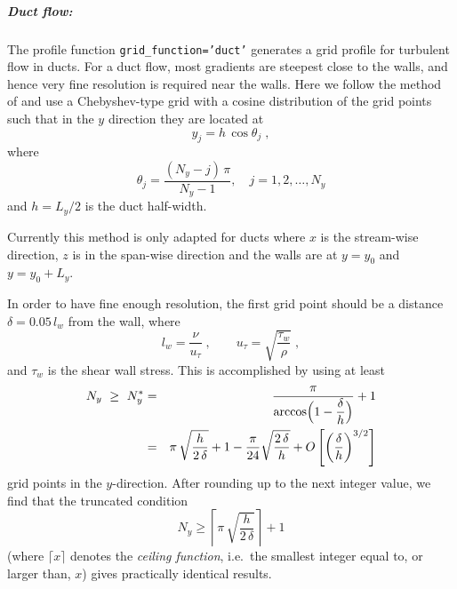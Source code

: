 \documentclass[\mydriver,12pt,twoside,notitlepage,a4paper]{article}
\newcommand{\code}[1]{\texttt{#1}}
\begin{document}
\subparagraph{Duct flow:}
The profile function \code{grid_function='duct'} generates a grid profile
for turbulent flow in ducts.
For a duct flow, most gradients are steepest close to the walls, and hence
very fine resolution is required near the walls.
Here we follow the method of \cite{kim87} and use a Chebyshev-type grid
with a cosine distribution of the grid points such that in the $y$
direction they are located at
\begin{equation}
  \label{deltay}
  y_j = h \, \cos \theta_j \; ,
\end{equation}
where
\begin{equation}
  \theta_j = \frac{(N_y{-}j)\,\pi}{N_y{-}1}, \quad j=1, 2, \ldots, N_y
\end{equation}
and $h=L_y/2$ is the duct half-width.

Currently this method is only adapted for ducts where $x$ is
the stream-wise direction, $z$ is in the span-wise direction and the walls
are at $y=y_0$ and $y=y_0+L_y$.

In order to have fine enough resolution, the first grid point should be
a distance $\delta = 0.05\,l_w$ from the wall, where
\begin{equation}
  l_w      = \frac{\nu}{u_{\tau}} \; ,
  \qquad
  u_{\tau} = \sqrt{\dfrac{\tau_w}{\rho}} \; ,
\end{equation}
and $\tau_w$ is the shear wall stress.
This is accomplished by using at least
\begin{eqnarray}
  N_y \ \ge\ N_y^* &=& \frac{\pi}{\arccos \Bigl(1-\dfrac{\delta}{h}\Bigr)}
                       + 1 \\
                   &=&  \pi\,\sqrt{\dfrac{h}{2\,\delta}} + 1
                        - \dfrac{\pi}{24} \sqrt{\dfrac{2\,\delta}{h}}
                        + O\left[\left(\dfrac{\delta}{h}\right)^{3/2}\right]
\end{eqnarray}
grid points in the $y$-direction.
After rounding up to the next integer value, we find that the truncated
condition
\begin{equation}
  N_y \ge \left\lceil \pi\,\sqrt{\dfrac{h}{2\,\delta}} \right\rceil + 1
\end{equation}
(where $\lceil x \rceil$ denotes the \emph{ceiling function}, i.e.~the
smallest integer equal to, or larger than, $x$)
gives practically identical results.
\end{document}
